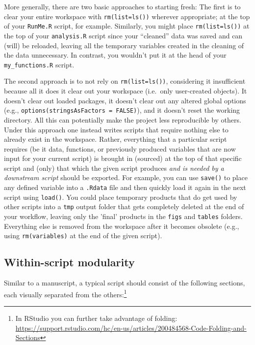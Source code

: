 \documentclass[12pt,letterpaper]{article}
\begin{document}
More generally, there are two basic approaches to starting fresh:
The first is to clear your entire workspace with \texttt{rm(list=ls())} wherever appropriate;
at the top of your \texttt{RunMe.R} script, for example.
Similarly, you might place \texttt{rm(list=ls())} at the top of your \texttt{analysis.R} script since your 
``cleaned'' data was saved and can (will) be reloaded, leaving all the temporary variables created in 
the cleaning of the data unnecessary.
In contrast, you wouldn't put it at the head of your \texttt{my\_functions.R} script.

The second approach is to not rely on \texttt{rm(list=ls())}, considering it insufficient because all it 
does it clear out your workspace (i.e.~only user-created objects).
It doesn't clear out loaded packages,
it doesn't clear out any altered global options (e.g., \texttt{options(stringsAsFactors = FALSE)}),
and it doesn't reset the working directory.
All this can potentially make the project less reproducible by others.
Under this approach one instead writes scripts that require nothing else to already exist in the 
workspace.
Rather, everything that a particular script requires (be it data, functions, or previously produced 
variables that are now input for your current script) is brought in (sourced) at the top of that specific 
script
and (only) that which the given script produces \emph{and is needed by a downstream script} 
should be exported.
For example, you can use \texttt{save()} to place any defined variable into a \texttt{.Rdata} file and 
then quickly load it again in the next script using \texttt{load()}. 
You could  place temporary products that do get used by other scripts into a \texttt{tmp} output 
folder that gets completely deleted at the end of your workflow, leaving only the 'final' products in 
the \texttt{figs} and \texttt{tables} folders.
Everything else is removed from the workspace after it becomes obsolete
(e.g., using \texttt{rm(variables)} at the end of the given script).








\subsection{Within-script modularity}

Similar to a manuscript, a typical script should consist of the following sections, each visually 
separated from the others:\footnote{In RStudio you can further take advantage of folding: 
\url{https://support.rstudio.com/hc/en-us/articles/200484568-Code-Folding-and-Sections}}
\end{document}
